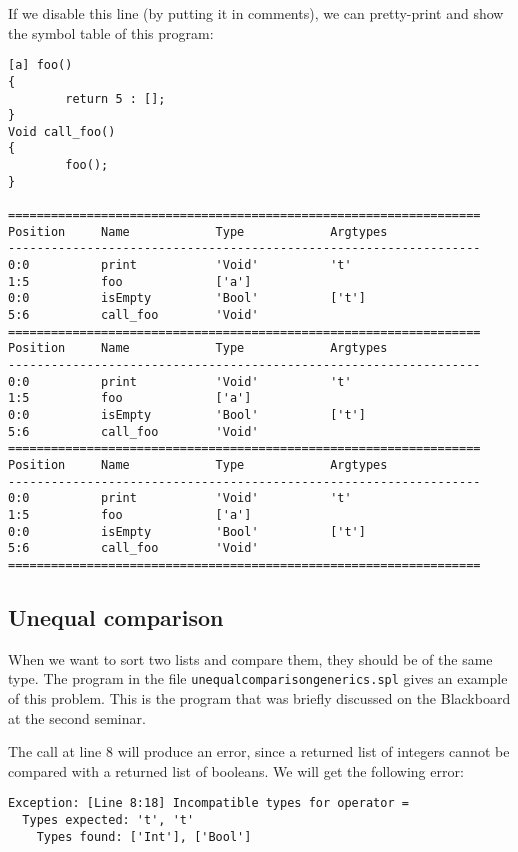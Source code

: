 \documentclass[a4paper]{article}
\begin{document}
If we disable this line (by putting it in comments), we can pretty-print and show the symbol table of this program:
\begin{verbatim}
[a] foo()
{
        return 5 : [];
}
Void call_foo()
{
        foo();
}

==================================================================
Position     Name            Type            Argtypes            
------------------------------------------------------------------
0:0          print           'Void'          't'                 
1:5          foo             ['a']                               
0:0          isEmpty         'Bool'          ['t']               
5:6          call_foo        'Void'                              
==================================================================
Position     Name            Type            Argtypes            
------------------------------------------------------------------
0:0          print           'Void'          't'                 
1:5          foo             ['a']                               
0:0          isEmpty         'Bool'          ['t']               
5:6          call_foo        'Void'                              
==================================================================
Position     Name            Type            Argtypes            
------------------------------------------------------------------
0:0          print           'Void'          't'                 
1:5          foo             ['a']                               
0:0          isEmpty         'Bool'          ['t']               
5:6          call_foo        'Void'                              
==================================================================
\end{verbatim}

\subsection{Unequal comparison}
When we want to sort two lists and compare them, they should be of the same type. The program in the file {\tt unequalcomparisongenerics.spl} gives an example of this problem. This is the program that was briefly discussed on the Blackboard at the second seminar.

The call at line 8 will produce an error, since a returned list of integers cannot be compared with a returned list of booleans. We will get the following error: 
\begin{verbatim}
Exception: [Line 8:18] Incompatible types for operator = 
  Types expected: 't', 't'
    Types found: ['Int'], ['Bool']
\end{verbatim}
\end{document}

